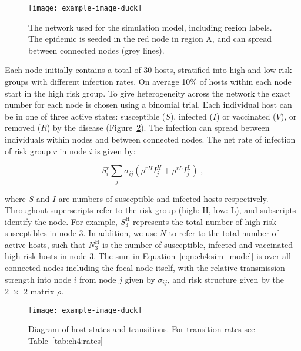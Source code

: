 \begin{figure}[htb]
    \begin{center}
        \texttt{[image: example-image-duck]}%
        \caption{The network used for the simulation model, including region labels. The epidemic is seeded in the red node in region A, and can spread between connected nodes (grey lines).}
        \label{fig:ch4:node_structure}
    \end{center}
\end{figure}

Each node initially contains a total of 30 hosts, stratified into high and low risk groups with different infection rates. On average 10\% of hosts within each node start in the high risk group. To give heterogeneity across the network the exact number for each node is chosen using a binomial trial. Each individual host can be in one of three active states: susceptible ($S$), infected ($I$) or vaccinated ($V$), or removed ($R$) by the disease (Figure~\ref{fig:ch4:model_structure}). The infection can spread between individuals within nodes and between connected nodes. The net rate of infection of risk group $r$ in node $i$ is given by:
\begin{linenomath*}
    \begin{equation}
        S_i^r \sum_j \sigma_{ij} \left(\rho^{rH}I_j^H + \rho^{rL}I_j^L\right)\;,
    \label{eqn:ch4:sim_model}
    \end{equation}
\end{linenomath*}
where $S$ and $I$ are numbers of susceptible and infected hosts respectively. Throughout superscripts refer to the risk group (high: H, low: L), and subscripts identify the node. For example, $S_{3}^\mathrm{H}$ represents the total number of high risk susceptibles in node 3. In addition, we use $N$ to refer to the total number of active hosts, such that $N_{3}^\mathrm{H}$ is the number of susceptible, infected and vaccinated high risk hosts in node 3. The sum in Equation~\ref{eqn:ch4:sim_model} is over all connected nodes including the focal node itself, with the relative transmission strength into node $i$ from node $j$ given by $\sigma_{ij}$, and risk structure given by the \num{2x2} matrix $\rho$.

\begin{figure}[htb]
    \begin{center}
        \texttt{[image: example-image-duck]}%
        \caption{Diagram of host states and transitions. For transition rates see Table~\ref{tab:ch4:rates}}
        \label{fig:ch4:model_structure}
    \end{center}
\end{figure}


